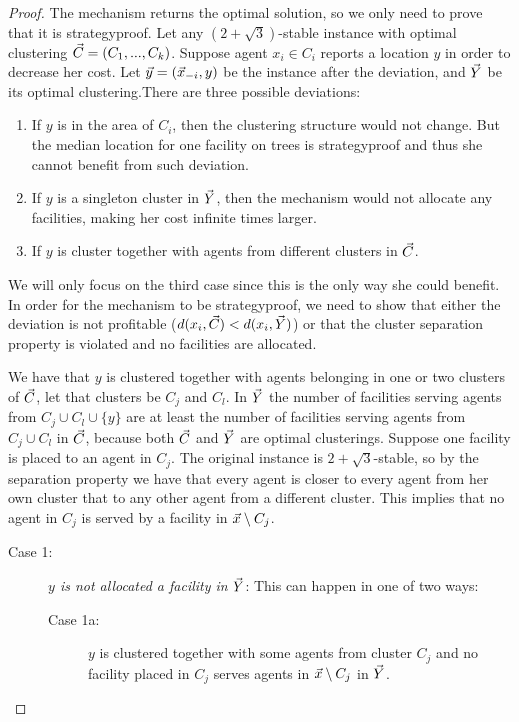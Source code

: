 \begin{proof}
The mechanism returns the optimal solution, so we only need to prove that it is strategyproof. Let any $(2+\sqrt{3})$-stable instance with optimal clustering $\vec{C} = (C_1,..., C_k)$. Suppose agent $x_i \in C_i$ reports a location $y$ in order to decrease her cost. Let $\vec{y} = (\vec{x}_{-i},y)$ be the instance after the deviation, and $\vec{Y}$ be its optimal clustering.There are three possible deviations:
\begin{enumerate}[1.]
    \item If $y$ is in the area of $C_i$, then the clustering structure would not change. But the median location for one facility on trees is strategyproof and thus she cannot benefit from such deviation.
    \item If $y$ is a singleton cluster in $\vec{Y}$, then the mechanism would not allocate any facilities, making her cost infinite times larger.
    \item If $y$ is cluster together with agents from different clusters in $\vec{C}$. 
\end{enumerate}

We will only focus on the third case since this is the only way she could benefit. In order for the mechanism to be strategyproof, we need to show that either the deviation is not profitable ($d(x_i,\vec{C}) < d(x_i,\vec{Y})$) or that the cluster separation property is violated and no facilities are allocated. 

We have that $y$ is clustered together with agents belonging in one or two clusters of $\vec{C}$, let that clusters be $C_j$ and $C_l$. In $\vec{Y}$ the number of facilities serving agents from $C_j\cup C_l \cup \{y \}$ are at least the number of facilities serving agents from $C_j\cup C_l$ in $\vec{C}$, because both $\vec{C}$ and $\vec{Y}$ are optimal clusterings. Suppose one facility is placed to an agent in $C_j$. The original instance is $2+\sqrt{3}$-stable, so by the separation property we have that every agent is closer to every agent from her own cluster that to any other agent from a different cluster. This implies that no agent in $C_j$ is served by a facility in $\vec{x}\setminus C_j$. 
 
\begin{description}
\item[Case 1:] \textit{ $y$ is not allocated a facility in $\vec{Y}$}: This can happen in one of two ways:
    \begin{description}
        \item[Case 1a:] $y$ is clustered together with some agents from cluster $C_j$ and no facility placed in $C_j$ serves agents in $\vec{x}\setminus C_j$ in $\vec{Y}$. 
        

\end{description}
\end{description}
\end{proof}
